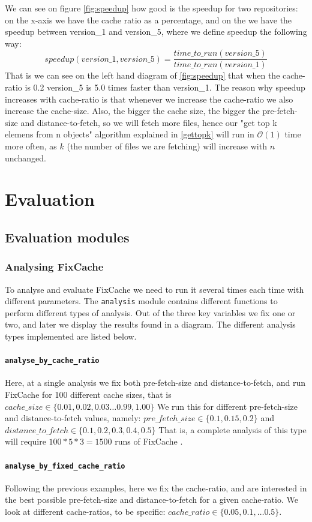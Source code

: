 \documentclass[12pt,twoside,notitlepage]{report}
\newcommand{\fxch}{FixCache }
\begin{document}
We can see on figure \ref{fig:speedup} how good is the speedup for two repositories: on the x-axis we have the cache ratio as a percentage, and on the we have the speedup between version\_1 and version\_5, where we define speedup the following way:
\[speedup(version\_1,version\_5) = \frac{time\_to\_run(version\_5)}{time\_to\_run(version\_1)}
\]
That is we can see on the left hand diagram of \ref{fig:speedup} that when the cache-ratio is 0.2 version\_5 is 5.0 times faster than version\_1. The reason why speedup increases with cache-ratio is that whenever we increase the cache-ratio we also increase the cache-size. Also, the bigger the cache size, the bigger the pre-fetch-size and distance-to-fetch, so we will fetch more files, hence our "get top k elemens from n objects" algorithm explained in \ref{gettopk} will run in $\mathcal{O}(1)$ time more often, as $k$ (the number of files we are fetching) will increase with $n$ unchanged.
\chapter{Evaluation}
\section{Evaluation modules}
\subsection{Analysing \fxch}
To analyse and evaluate \fxch we need to run it several times each time with different parameters. The \texttt{analysis} module contains different functions to perform different types of analysis. Out of the three key variables we fix one or two, and later we display the results found in a diagram. The different analysis types implemented are listed below.
\subsubsection{\texttt{analyse\_by\_cache\_ratio}} Here, at a single analysis we fix both pre-fetch-size and distance-to-fetch, and run \fxch for 100 different cache sizes, that is $cache\_size \in \{0.01, 0.02, 0.03 \dots 0.99, 1.00\}$ We run this for different pre-fetch-size and distance-to-fetch values, namely: $pre\_fetch\_size \in \{0.1, 0.15, 0.2\}$ and $distance\_to\_fetch \in \{0.1, 0.2, 0.3, 0.4, 0.5\}$ That is, a complete analysis of this type will require $100*5*3=1500$ runs of \fxch.
\subsubsection{\texttt{analyse\_by\_fixed\_cache\_ratio}} 
Following the previous examples, here we fix the cache-ratio, and are interested in the best possible pre-fetch-size and distance-to-fetch for a given cache-ratio. We look at different cache-ratios, to be specific: $cache\_ratio \in \{0.05, 0.1, \dots 0.5\}$. 
\end{document}
